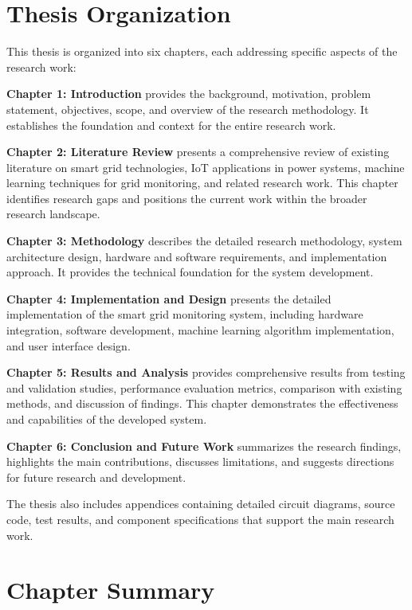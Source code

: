 \section{Thesis Organization}
\label{sec:thesis_organization}

This thesis is organized into six chapters, each addressing specific aspects of the research work:

\textbf{Chapter 1: Introduction} provides the background, motivation, problem statement, objectives, scope, and overview of the research methodology. It establishes the foundation and context for the entire research work.

\textbf{Chapter 2: Literature Review} presents a comprehensive review of existing literature on smart grid technologies, IoT applications in power systems, machine learning techniques for grid monitoring, and related research work. This chapter identifies research gaps and positions the current work within the broader research landscape.

\textbf{Chapter 3: Methodology} describes the detailed research methodology, system architecture design, hardware and software requirements, and implementation approach. It provides the technical foundation for the system development.

\textbf{Chapter 4: Implementation and Design} presents the detailed implementation of the smart grid monitoring system, including hardware integration, software development, machine learning algorithm implementation, and user interface design.

\textbf{Chapter 5: Results and Analysis} provides comprehensive results from testing and validation studies, performance evaluation metrics, comparison with existing methods, and discussion of findings. This chapter demonstrates the effectiveness and capabilities of the developed system.

\textbf{Chapter 6: Conclusion and Future Work} summarizes the research findings, highlights the main contributions, discusses limitations, and suggests directions for future research and development.

The thesis also includes appendices containing detailed circuit diagrams, source code, test results, and component specifications that support the main research work.

\section{Chapter Summary}
\label{sec:chapter1_summary}

